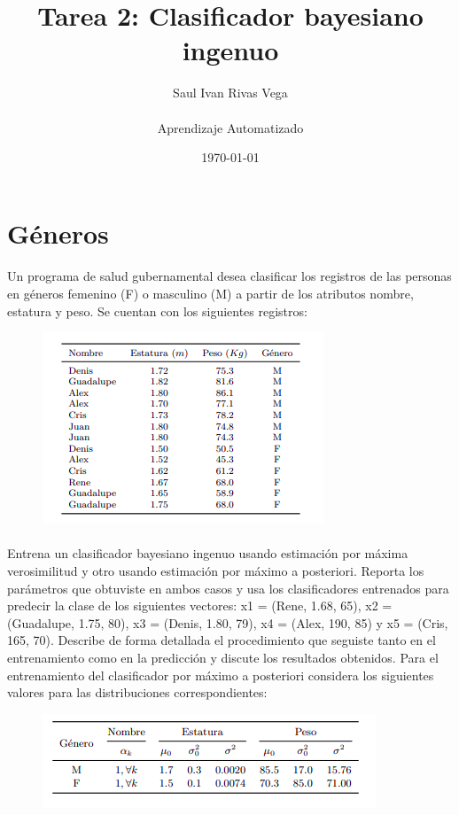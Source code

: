 \documentclass[12pt]{article}
\title{Tarea 2: Clasificador bayesiano ingenuo}
\author{
	Saul Ivan Rivas Vega \\
	\\
	Aprendizaje Automatizado\\
}
\date{\today}
\begin{document}
	\maketitle
	\pagebreak
	\section{Géneros}
	  \paragraph{} Un programa de salud gubernamental desea clasificar los registros de las personas en géneros femenino (F) o masculino (M) a partir de los atributos nombre, estatura y peso. Se cuentan con los
	  siguientes registros:\\
	  \begin{figure}[h!]
	  	\centering
	  	\includegraphics[width=.6\linewidth]{excercise1}
	  	\label{fig1}
	  \end{figure}
  \paragraph{} Entrena un clasificador bayesiano ingenuo usando estimación por máxima verosimilitud y otro usando estimación por máximo a posteriori. Reporta los parámetros que obtuviste en ambos casos y usa los clasificadores entrenados para predecir la clase de los siguientes vectores: x1 = (Rene, 1.68, 65), x2 = (Guadalupe, 1.75, 80), x3 = (Denis, 1.80, 79), x4 = (Alex, 190, 85) y x5 = (Cris, 165, 70).
  Describe de forma detallada el procedimiento que seguiste tanto en el entrenamiento como en la predicción y discute los resultados obtenidos.
  Para el entrenamiento del clasificador por máximo a posteriori considera los siguientes valores
  para las distribuciones correspondientes:
	  \begin{figure}[h!]
	  	\centering
	  	\includegraphics[width=.6\linewidth]{ex1_002}
	  	\label{fig2}
	  \end{figure}
\end{document}
